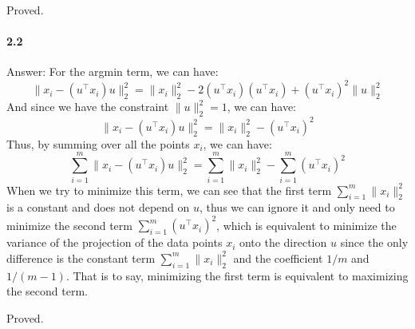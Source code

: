 \documentclass[11pt]{article}
\begin{document}
Proved.

\paragraph{2.2}
Answer:
\newline
For the argmin term, we can have:
\begin{equation}
  \|x_i-(u^\top x_i)u\|_2^2 = \|x_i\|_2^2 - 2(u^\top x_i)(u^\top x_i) + (u^\top x_i)^2 \|u\|^2_2
\end{equation}
And since we have the constraint $\|u\|_2^2 = 1$, we can have:
\begin{equation}
  \|x_i-(u^\top x_i)u\|_2^2 = \|x_i\|_2^2 - (u^\top x_i)^2
\end{equation}
Thus, by summing over all the points $x_i$, we can have:
\begin{equation}
  \sum_{i=1}^m \|x_i-(u^\top x_i)u\|_2^2 = \sum_{i=1}^m \|x_i\|_2^2 - \sum_{i=1}^m (u^\top x_i)^2
\end{equation}
When we try to minimize this term, we can see that the first term $\sum_{i=1}^m \|x_i\|_2^2$ is a constant and does not depend on $u$, thus we can ignore it and only need to minimize the second term $\sum_{i=1}^m (u^\top x_i)^2$, which is equivalent to minimize the variance of the projection of the data points $x_i$ onto the direction $u$ since the only difference is the constant term $\sum_{i=1}^m \|x_i\|_2^2$ and the coefficient $1/m$ and $1/(m-1)$.
That is to say, minimizing the first term is equivalent to maximizing the second term.

Proved.
\end{document}
